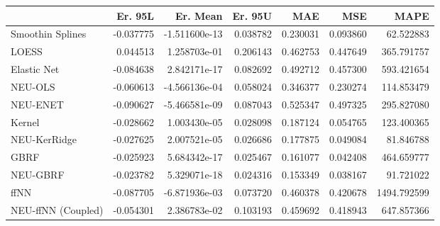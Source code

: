 \begin{tabular}{lrrrrrr}
\toprule
{} &   Er. 95L &      Er. Mean &   Er. 95U &       MAE &       MSE &         MAPE \\
\midrule
Smoothin Splines   & -0.037775 & -1.511600e-13 &  0.038782 &  0.230031 &  0.093860 &    62.522883 \\
LOESS              &  0.044513 &  1.258703e-01 &  0.206143 &  0.462753 &  0.447649 &   365.791757 \\
Elastic Net        & -0.084638 &  2.842171e-17 &  0.082692 &  0.492712 &  0.457300 &   593.421654 \\
NEU-OLS            & -0.060613 & -4.566136e-04 &  0.058024 &  0.346377 &  0.230274 &   114.853479 \\
NEU-ENET           & -0.090627 & -5.466581e-09 &  0.087043 &  0.525347 &  0.497325 &   295.827080 \\
Kernel             & -0.028662 &  1.003430e-05 &  0.028098 &  0.187124 &  0.054765 &   123.400365 \\
NEU-KerRidge       & -0.027625 &  2.007521e-05 &  0.026686 &  0.177875 &  0.049084 &    81.846788 \\
GBRF               & -0.025923 &  5.684342e-17 &  0.025467 &  0.161077 &  0.042408 &   464.659777 \\
NEU-GBRF           & -0.023782 &  5.329071e-18 &  0.024316 &  0.153349 &  0.038167 &    91.721022 \\
ffNN               & -0.087705 & -6.871936e-03 &  0.073720 &  0.460378 &  0.420678 &  1494.792599 \\
NEU-ffNN (Coupled) & -0.054301 &  2.386783e-02 &  0.103193 &  0.459692 &  0.418943 &   647.857366 \\
\bottomrule
\end{tabular}
